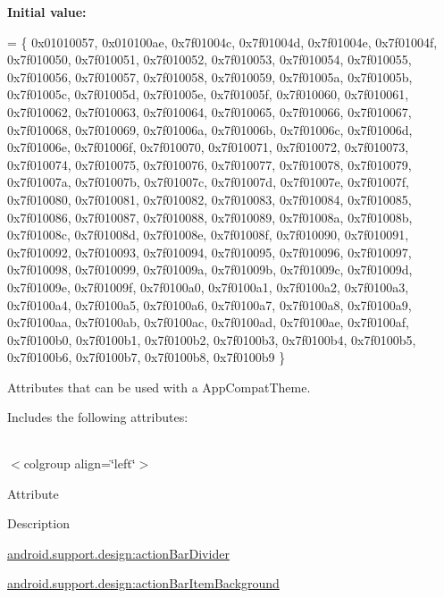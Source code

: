 {\bfseries Initial value\+:}
\begin{DoxyCode}
= \{
            0x01010057, 0x010100ae, 0x7f01004c, 0x7f01004d,
            0x7f01004e, 0x7f01004f, 0x7f010050, 0x7f010051,
            0x7f010052, 0x7f010053, 0x7f010054, 0x7f010055,
            0x7f010056, 0x7f010057, 0x7f010058, 0x7f010059,
            0x7f01005a, 0x7f01005b, 0x7f01005c, 0x7f01005d,
            0x7f01005e, 0x7f01005f, 0x7f010060, 0x7f010061,
            0x7f010062, 0x7f010063, 0x7f010064, 0x7f010065,
            0x7f010066, 0x7f010067, 0x7f010068, 0x7f010069,
            0x7f01006a, 0x7f01006b, 0x7f01006c, 0x7f01006d,
            0x7f01006e, 0x7f01006f, 0x7f010070, 0x7f010071,
            0x7f010072, 0x7f010073, 0x7f010074, 0x7f010075,
            0x7f010076, 0x7f010077, 0x7f010078, 0x7f010079,
            0x7f01007a, 0x7f01007b, 0x7f01007c, 0x7f01007d,
            0x7f01007e, 0x7f01007f, 0x7f010080, 0x7f010081,
            0x7f010082, 0x7f010083, 0x7f010084, 0x7f010085,
            0x7f010086, 0x7f010087, 0x7f010088, 0x7f010089,
            0x7f01008a, 0x7f01008b, 0x7f01008c, 0x7f01008d,
            0x7f01008e, 0x7f01008f, 0x7f010090, 0x7f010091,
            0x7f010092, 0x7f010093, 0x7f010094, 0x7f010095,
            0x7f010096, 0x7f010097, 0x7f010098, 0x7f010099,
            0x7f01009a, 0x7f01009b, 0x7f01009c, 0x7f01009d,
            0x7f01009e, 0x7f01009f, 0x7f0100a0, 0x7f0100a1,
            0x7f0100a2, 0x7f0100a3, 0x7f0100a4, 0x7f0100a5,
            0x7f0100a6, 0x7f0100a7, 0x7f0100a8, 0x7f0100a9,
            0x7f0100aa, 0x7f0100ab, 0x7f0100ac, 0x7f0100ad,
            0x7f0100ae, 0x7f0100af, 0x7f0100b0, 0x7f0100b1,
            0x7f0100b2, 0x7f0100b3, 0x7f0100b4, 0x7f0100b5,
            0x7f0100b6, 0x7f0100b7, 0x7f0100b8, 0x7f0100b9
        \}
\end{DoxyCode}
Attributes that can be used with a App\+Compat\+Theme. 

Includes the following attributes\+:

\tabulinesep=1mm
\begin{longtabu} spread 0pt [c]{*{0}{|X[-1]}|}
\hline
\end{longtabu}
$<$colgroup align=\char`\"{}left\char`\"{}$>$ 

Attribute

Description 

{\ttfamily \hyperlink{classandroid_1_1support_1_1design_1_1R_1_1styleable_a114c1b92963957310f5ba215a1c81a77}{android.\+support.\+design\+:action\+Bar\+Divider}}

{\ttfamily \hyperlink{classandroid_1_1support_1_1design_1_1R_1_1styleable_af6c020b0e1ecf70811c2d81f3d06d55b}{android.\+support.\+design\+:action\+Bar\+Item\+Background}}

